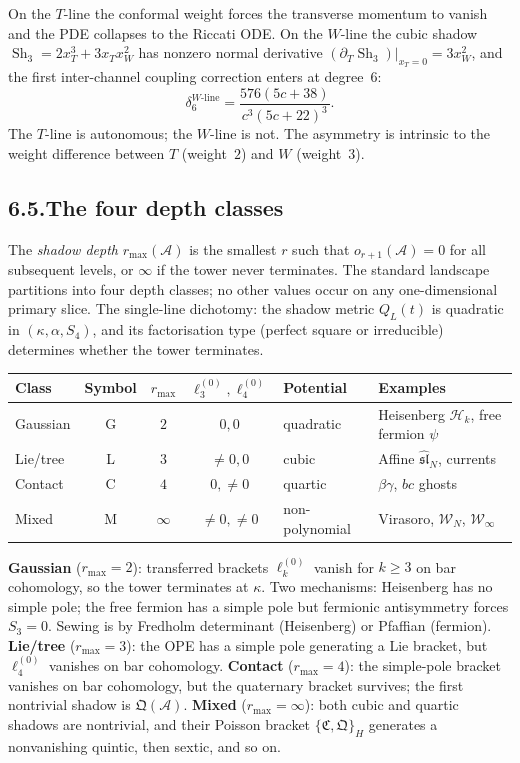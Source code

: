 \documentclass[11pt,reqno]{amsart}
\theoremstyle{definition}
\theoremstyle{remark}
\providecommand{\cA}{\mathcal{A}}
\providecommand{\cH}{\mathcal{H}}
\numberwithin{equation}{section}
\begin{document}
On the $T$-line the conformal weight forces the transverse momentum to
vanish and the PDE collapses to the Riccati ODE. On the $W$-line the
cubic shadow $\operatorname{Sh}_3=2x_T^3+3x_Tx_W^2$ has nonzero normal
derivative $(\partial_T\operatorname{Sh}_3)|_{x_T=0}=3x_W^2$, and the
first inter-channel coupling correction enters at degree~$6$:
\[
\delta_6^{W\text{-line}}=\frac{576(5c+38)}{c^3(5c+22)^3}.
\]
The $T$-line is autonomous; the $W$-line is not. The asymmetry is
intrinsic to the weight difference between $T$ (weight~$2$) and $W$
(weight~$3$).

\subsection*{6.5.\enspace The four depth classes}

The \emph{shadow depth} $r_{\max}(\cA)$ is the smallest $r$ such that
$o_{r+1}(\cA)=0$ for all subsequent levels, or $\infty$ if the tower
never terminates. The standard landscape partitions into four depth
classes; no other values occur on any one-dimensional primary slice.
The single-line dichotomy: the shadow metric $Q_L(t)$ is quadratic in
$(\kappa,\alpha,S_4)$, and its factorisation type (perfect square or
irreducible) determines whether the tower terminates.

\begin{center}
\renewcommand{\arraystretch}{1.3}
\begin{tabular}{lcccll}
\textbf{Class} & \textbf{Symbol} & $r_{\max}$ & $\ell_3^{(0)},\ell_4^{(0)}$ & \textbf{Potential} & \textbf{Examples}\\
\hline
Gaussian & G & $2$ & $0,0$ & quadratic & Heisenberg $\cH_k$, free fermion $\psi$\\
Lie/tree & L & $3$ & $\neq 0,0$ & cubic & Affine $\widehat{\mathfrak{sl}}_N$, currents\\
Contact & C & $4$ & $0,\neq 0$ & quartic & $\beta\gamma$, $bc$ ghosts\\
Mixed & M & $\infty$ & $\neq 0,\neq 0$ & non-polynomial & Virasoro, $\mathcal W_N$, $\mathcal W_\infty$
\end{tabular}
\end{center}

\noindent
\textbf{Gaussian} ($r_{\max}=2$): transferred brackets $\ell_k^{(0)}$
vanish for $k\ge 3$ on bar cohomology, so the tower terminates at
$\kappa$. Two mechanisms: Heisenberg has no simple pole; the free
fermion has a simple pole but fermionic antisymmetry forces $S_3=0$.
Sewing is by Fredholm determinant (Heisenberg) or Pfaffian (fermion).
\textbf{Lie/tree} ($r_{\max}=3$): the OPE has a simple pole generating
a Lie bracket, but $\ell_4^{(0)}$ vanishes on bar cohomology.
\textbf{Contact} ($r_{\max}=4$): the simple-pole bracket vanishes on
bar cohomology, but the quaternary bracket survives; the first
nontrivial shadow is $\mathfrak Q(\cA)$. \textbf{Mixed}
($r_{\max}=\infty$): both cubic and quartic shadows are nontrivial,
and their Poisson bracket $\{\mathfrak C,\mathfrak Q\}_H$ generates a
nonvanishing quintic, then sextic, and so on.
\end{document}
